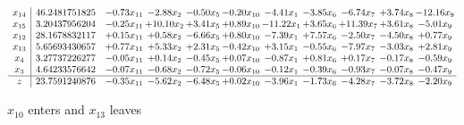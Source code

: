 \documentclass[9pt]{article}
\begin{document}
 \[\begin{array}{c| c c@{\hskip 2pt} c@{\hskip 2pt} c@{\hskip 2pt} c@{\hskip 2pt} c@{\hskip 2pt} c@{\hskip 2pt} c@{\hskip 2pt} c@{\hskip 2pt} c@{\hskip 2pt} }
 x_{14}   &  46.2481751825 & -0.73 x_{11} & -2.88 x_{2} & -0.50 x_{5} & -0.20 x_{10} & -4.41 x_{1} & -3.85 x_{6} & -6.74 x_{7} & +  3.74 x_{8} & -12.16 x_{9}\\
 x_{15}   &  3.20437956204 & -0.25 x_{11} & + 10.10 x_{2} & +  3.41 x_{5} & +  0.89 x_{10} & -11.22 x_{1} & +  3.65 x_{6} & + 11.39 x_{7} & +  3.61 x_{8} & -5.01 x_{9}\\
 x_{12}   &  28.1678832117 & +  0.15 x_{11} & +  0.58 x_{2} & -6.66 x_{5} & +  0.80 x_{10} & -7.39 x_{1} & +  7.57 x_{6} & -2.50 x_{7} & -4.50 x_{8} & +  0.77 x_{9}\\
 x_{13}   &  5.65693430657 & +  0.77 x_{11} & +  5.33 x_{2} & +  2.31 x_{5} & -0.42 x_{10} & +  3.15 x_{1} & -0.55 x_{6} & -7.97 x_{7} & -3.03 x_{8} & +  2.81 x_{9}\\
 x_{4}   &  3.27737226277 & -0.05 x_{11} & +  0.14 x_{2} & -0.45 x_{5} & +  0.07 x_{10} & -0.87 x_{1} & +  0.81 x_{6} & +  0.17 x_{7} & -0.17 x_{8} & -0.59 x_{9}\\
 x_{3}   &  4.64233576642 & -0.07 x_{11} & -0.68 x_{2} & -0.72 x_{5} & -0.06 x_{10} & -0.12 x_{1} & -0.39 x_{6} & -0.93 x_{7} & -0.07 x_{8} & -0.47 x_{9}\\
\hline
z    &  23.7591240876 & -0.35 x_{11} & -5.62 x_{2} & -6.48 x_{5} & +  0.02 x_{10} & -3.96 x_{1} & -1.73 x_{6} & -4.28 x_{7} & -3.72 x_{8} & -2.20 x_{9}\\
\end{array}\]


 $ x_{10} $ enters and $ x_{13} $ leaves 
\end{document}
